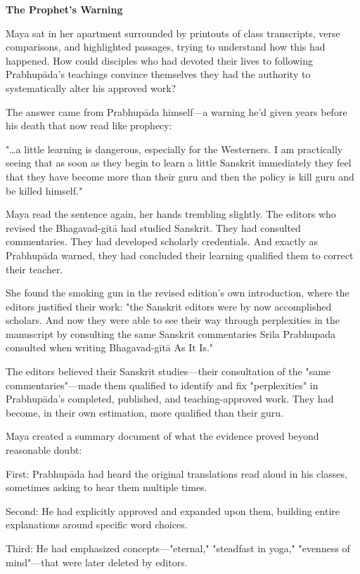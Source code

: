 \documentclass[12pt,twoside]{book}
\begin{document}
\vspace{0.5cm}
\textbf{The Prophet's Warning}
\vspace{0.2cm}


Maya sat in her apartment surrounded by printouts of class transcripts, verse comparisons, and highlighted passages, trying to understand how this had happened. How could disciples who had devoted their lives to following Prabhupāda's teachings convince themselves they had the authority to systematically alter his approved work?

The answer came from Prabhupāda himself—a warning he'd given years before his death that now read like prophecy:

"\ldots{}a little learning is dangerous, especially for the Westerners. I am practically seeing that as soon as they begin to learn a little Sanskrit immediately they feel that they have become more than their guru and then the policy is kill guru and be killed himself."

Maya read the sentence again, her hands trembling slightly. The editors who revised the Bhagavad-gītā had studied Sanskrit. They had consulted commentaries. They had developed scholarly credentials. And exactly as Prabhupāda warned, they had concluded their learning qualified them to correct their teacher.

She found the smoking gun in the revised edition's own introduction, where the editors justified their work: "the Sanskrit editors were by now accomplished scholars. And now they were able to see their way through perplexities in the manuscript by consulting the same Sanskrit commentaries Srila Prabhupada consulted when writing Bhagavad-gītā As It Is."

The editors believed their Sanskrit studies—their consultation of the "same commentaries"—made them qualified to identify and fix "perplexities" in Prabhupāda's completed, published, and teaching-approved work. They had become, in their own estimation, more qualified than their guru.

Maya created a summary document of what the evidence proved beyond reasonable doubt:

First: Prabhupāda had heard the original translations read aloud in his classes, sometimes asking to hear them multiple times.

Second: He had explicitly approved and expanded upon them, building entire explanations around specific word choices.

Third: He had emphasized concepts—"eternal," "steadfast in yoga," "evenness of mind"—that were later deleted by editors.
\end{document}
